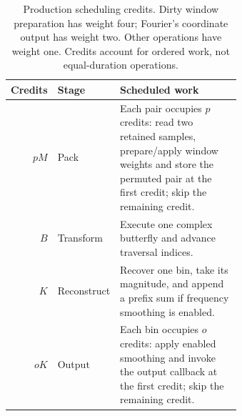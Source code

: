 \begin{table}[tb]
\centering\small
\begin{tabular}{@{}rlp{0.64\linewidth}@{}}
\toprule
Credits & Stage & Scheduled work \\
\midrule
$pM$ & Pack & Each pair occupies $p$ credits: read two retained samples, prepare/apply window weights and store the permuted pair at the first credit; skip the remaining credit. \\
$B$ & Transform & Execute one complex butterfly and advance traversal indices. \\
$K$ & Reconstruct & Recover one bin, take its magnitude, and append a prefix sum if frequency smoothing is enabled. \\
$oK$ & Output & Each bin occupies $o$ credits: apply enabled smoothing and invoke the output callback at the first credit; skip the remaining credit. \\
\bottomrule
\end{tabular}
\caption{Production scheduling credits. Dirty window preparation has weight four; Fourier's coordinate output has weight two. Other operations have weight one. Credits account for ordered work, not equal-duration operations.}
\label{tab:units}
\end{table}
